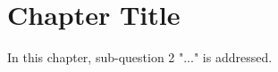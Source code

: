 \chapter{Chapter Title}
\label{ch4: second-core-chapter}
\minitoc

In this chapter, sub-question 2 "..." is addressed.